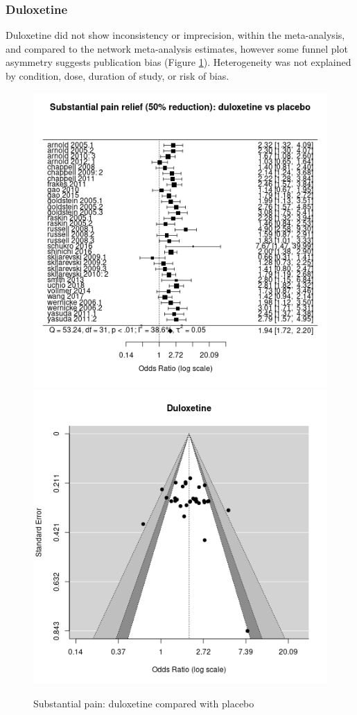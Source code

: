 \documentclass{report}\usepackage[]{graphicx}\usepackage[]{color}
\newenvironment{knitrout}{}{} %
\begin{document}
\subsubsection{Duloxetine}


Duloxetine did not show inconsistency or imprecision, within the meta-analysis, and compared to the network meta-analysis estimates, however some funnel plot asymmetry suggests publication bias (Figure \ref{fig:painsub-dulox-plac}). Heterogeneity was not explained by condition, dose, duration of study, or risk of bias.

\begin{figure}

\begin{knitrout}
\color{fgcolor}
\includegraphics[width=0.5\linewidth,height=0.35\textheight]{img/pain_sub-duloxetine-placebo-forest} 
\includegraphics[width=0.5\linewidth,height=0.35\textheight]{img/pain_sub-duloxetine-placebo-funnel} 
\end{knitrout}

\caption{Substantial pain: duloxetine compared with placebo
%
}
\label{fig:painsub-dulox-plac}
\end{figure}
\end{document}
